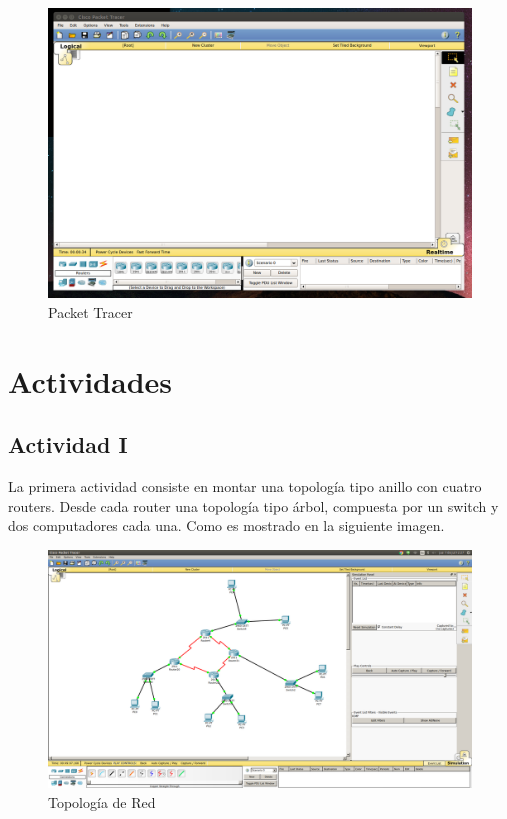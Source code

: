 \documentclass[spanish]{udpreport}
\begin{document}
\begin{figure}[H]
	\centering
	\includegraphics[scale=.25]{imagenes/A0e.png}
	\caption{Packet Tracer}
	\label{fig:Figura 1.1}
\end{figure}


\chapter{Actividades}

\section{Actividad I}

La primera actividad consiste en montar una topología tipo anillo con cuatro routers. Desde cada router una topología tipo árbol, compuesta por un switch y dos computadores cada una. Como es mostrado en la siguiente imagen.

\begin{figure}[H]
	\centering
	\includegraphics[scale=.25]{imagenes/red.png}
	\caption{Topología de Red}
	\label{fig:Figura 2.1}
\end{figure}
\end{document}

